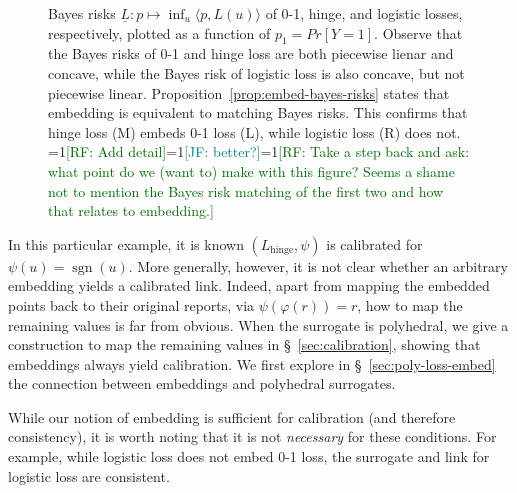 \documentclass[11pt]{article}
\newcommand{\Comments}{1}
\newcommand{\mynote}[2]{\ifnum\Comments=1\textcolor{#1}{#2}\fi}
\newcommand{\raf}[1]{\mynote{darkgreen}{[RF: #1]}}
\newcommand{\jessie}[1]{\mynote{teal}{[JF: #1]}}
\newcommand{\simplex}{\Delta_\Y}
\newcommand{\R}{\mathcal{R}}
\newcommand{\Y}{\mathcal{Y}}
\newcommand{\risk}[1]{\underline{#1}}
\newcommand{\inprod}[2]{\langle #1, #2 \rangle}%
\newcommand{\hinge}{L_{\mathrm{hinge}}}
\newcommand{\ellzo}{\ell_{\text{0-1}}}
\DeclareMathOperator*{\sgn}{sgn}
\begin{document}
\begin{figure}
\begin{minipage}{0.3\linewidth}
\end{minipage}
\caption{Bayes risks $\risk L : p \mapsto \inf_u \inprod{p}{L(u)}$ of 0-1, hinge, and logistic losses, respectively, plotted as a function of $p_1 = Pr[Y=1]$.
	Observe that the Bayes risks of 0-1 and hinge loss are both piecewise lienar and concave, while the Bayes risk of logistic loss is also concave, but not piecewise linear.  Proposition~\ref{prop:embed-bayes-risks} states that embedding is equivalent to matching Bayes risks.
	This confirms that hinge loss (M) embeds 0-1 loss (L), while logistic loss  (R) does not. \raf{Add detail}\jessie{better?}\raf{Take a step back and ask: what point do we (want to) make with this figure? Seems a shame not to mention the Bayes risk matching of the first two and how that relates to embedding.}}
\label{fig:bayes-risks-01}
\end{figure}

In this particular example, it is known $(\hinge,\psi)$ is calibrated for $\psi(u) = \sgn(u)$.
More generally, however, it is not clear whether an arbitrary embedding yields a calibrated link.
Indeed, apart from mapping the embedded points back to their original reports, via $\psi(\varphi(r)) = r$, how to map the remaining values is far from obvious.
When the surrogate is polyhedral, we give a construction to map the remaining values in \S~\ref{sec:calibration}, showing that embeddings always yield calibration.
We first explore in \S~\ref{sec:poly-loss-embed} the connection between embeddings and polyhedral surrogates.

While our notion of embedding is sufficient for calibration (and therefore consistency), it is worth noting that it is not \emph{necessary} for these conditions.  
For example, while logistic loss does not embed 0-1 loss, the surrogate and link for logistic loss are consistent.


\end{document}
